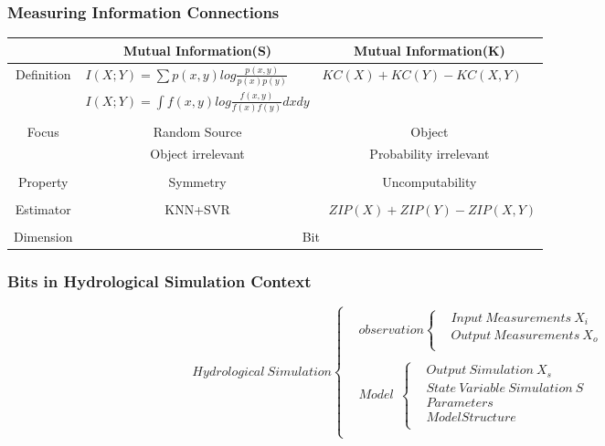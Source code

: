 \documentclass{beamer}
\begin{document}
\begin{CJK}{UTF8}{gkai}
\begin{frame}
\end{frame}

\begin{frame}
\frametitle{Measuring Information Connections}
\begin{tabular}{c p{4.5cm}  p{4.2cm} }
\toprule
&\multicolumn{1}{c}{Mutual Information(S)}&\multicolumn{1}{c}{Mutual Information(K)} \\ \hline
Definition & 
\scriptsize{$I(X;Y)=\sum p(x,y)log\frac{p(x,y)}{p(x)p(y)}$} & \scriptsize{$KC(X)+KC(Y)-KC(X,Y)$} \\ 
&\scriptsize{$I(X;Y)=\int f(x,y)log\frac{f(x,y)}{f(x)f(y)}dxdy$} \\ 
\\
Focus&\multicolumn{1}{c}{Random Source}&\multicolumn{1}{c}{Object}\\
&\multicolumn{1}{c}{Object irrelevant}&\multicolumn{1}{c}{Probability irrelevant}\\
\\
Property&\multicolumn{1}{c}{Symmetry}&\multicolumn{1}{c}{Uncomputability}\\
\\
Estimator&\multicolumn{1}{c}{KNN+SVR}&\ \scriptsize{$ZIP(X)+ZIP(Y)-ZIP(X,Y)$} \\
\\
Dimension&\multicolumn{2}{c}{Bit}\\
\hline
\end{tabular} 
\end{frame}

\begin{frame}
\frametitle{Bits in Hydrological Simulation Context}
 $$ Hydrological \ Simulation \left\{
\begin{aligned}
 &observation \left\{\begin{aligned}
&Input \ Measurements \ X_i\\
&Output \ Measurements \ X_o\\
\end{aligned}\right.\\
\\
 &Model \ \ \left\{\begin{aligned}
&Output\ Simulation \ X_s\\
&State\ Variable \ Simulation \ S \\
&Parameters \\
&Model Structure \\
\end{aligned}\right.\\
\end{aligned}
\right.
$$ 
\end{frame}


\end{CJK}
\end{document}
